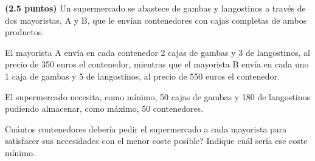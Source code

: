 
\textbf{(2.5 puntos)} Un supermercado se abastece de gambas y langostinos a través de dos mayoristas, A y B, que le envían contenedores con cajas completas de ambos productos.

El mayorista A envía en cada contenedor 2 cajas de gambas y 3 de langostinos, al precio de 350 euros el contenedor, mientras que el mayorista B envía en cada uno 1 caja de gambas y 5 de langostinos, al precio de 550 euros el contenedor.

El supermercado necesita, como mínimo, 50 cajas de gambas y 180 de langostinos pudiendo almacenar, como máximo, 50 contenedores.

\textquestiondown{}Cuántos contenedores debería pedir el supermercado a cada mayorista para satisfacer sus necesidades con el menor coste posible? Indique cuál sería ese coste mínimo.
